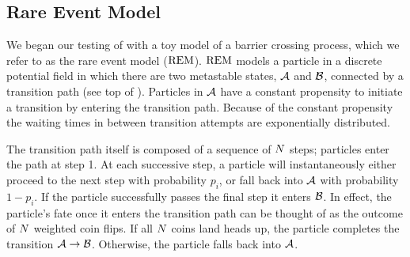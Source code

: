 \subsection{Rare Event Model}
\label{sec:rem}
We began our testing of  with a toy model of a barrier crossing process, which we refer to as the rare event model ($\text{REM}$). $\text{REM}$ models a particle in a discrete potential field in which there are two metastable states, $\mathcal{A}$ and $\mathcal{B}$, connected by a transition path (see top of ). Particles in $\mathcal{A}$ have a constant propensity to initiate a transition by entering the transition path. Because of the constant propensity the waiting times in between transition attempts are exponentially distributed.

The transition path itself is composed of a sequence of $N$ steps; particles enter the path at step 1. At each successive step, a particle will instantaneously either proceed to the next step with probability $p_i$, or fall back into $\mathcal{A}$ with probability $1 - p_i$. If the particle successfully passes the final step it enters $\mathcal{B}$. In effect, the particle's fate once it enters the transition path can be thought of as the outcome of $N$ weighted coin flips. If all $N$ coins land heads up, the particle completes the transition $\mathcal{A} \rightarrow \mathcal{B}$. Otherwise, the particle falls back into $\mathcal{A}$.

